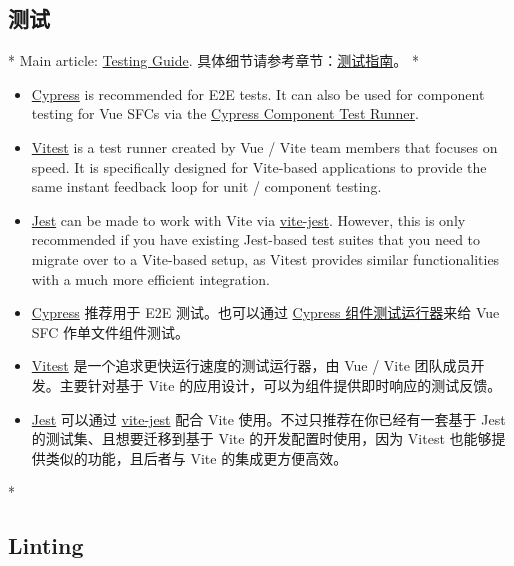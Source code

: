 \begin{paracol}{2}
\subsection{测试}
\switchcolumn[0]*%
Main article:
\href{https://vuejs.org/guide/scaling-up/testing.html}{Testing Guide}.
\switchcolumn
具体细节请参考章节：\href{https://cn.vuejs.org/guide/scaling-up/testing.html}{测试指南}。
\switchcolumn[0]*%
\begin{itemize}
\item
  \href{https://www.cypress.io/}{Cypress} is recommended for E2E tests.
  It can also be used for component testing for Vue SFCs via the
  \href{https://docs.cypress.io/guides/component-testing/introduction}{Cypress
  Component Test Runner}.
\item
  \href{https://vitest.dev/}{Vitest} is a test runner created by Vue /
  Vite team members that focuses on speed. It is specifically designed
  for Vite-based applications to provide the same instant feedback loop
  for unit / component testing.
\item
  \href{https://jestjs.io/}{Jest} can be made to work with Vite via
  \href{https://github.com/sodatea/vite-jest}{vite-jest}. However, this
  is only recommended if you have existing Jest-based test suites that
  you need to migrate over to a Vite-based setup, as Vitest provides
  similar functionalities with a much more efficient integration.
\end{itemize}
\switchcolumn
\begin{itemize}
\item
  \href{https://www.cypress.io/}{Cypress} 推荐用于 E2E 测试。也可以通过
  \href{https://docs.cypress.io/guides/component-testing/introduction}{Cypress
  组件测试运行器}来给 Vue SFC 作单文件组件测试。
\item
  \href{https://vitest.dev/}{Vitest}
  是一个追求更快运行速度的测试运行器，由 Vue / Vite
  团队成员开发。主要针对基于 Vite
  的应用设计，可以为组件提供即时响应的测试反馈。
\item
  \href{https://jestjs.io/}{Jest} 可以通过
  \href{https://github.com/sodatea/vite-jest}{vite-jest} 配合 Vite
  使用。不过只推荐在你已经有一套基于 Jest 的测试集、且想要迁移到基于
  Vite 的开发配置时使用，因为 Vitest 也能够提供类似的功能，且后者与 Vite
  的集成更方便高效。
\end{itemize}
\switchcolumn[0]*%
\subsection{Linting}
\switchcolumn

\end{paracol}
